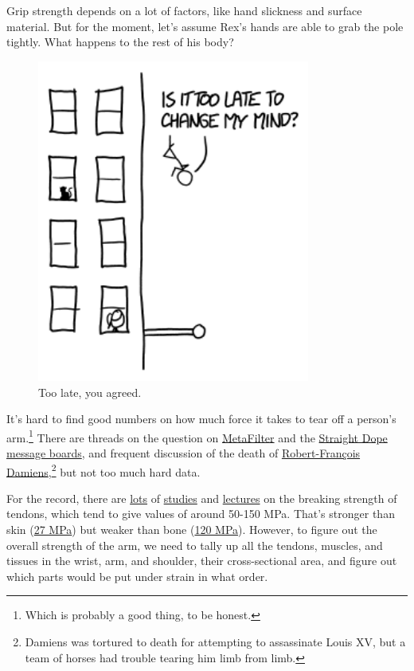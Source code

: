 {{Grip strength depends on a lot of factors, like hand slickness and surface material. But for the moment, let's assume Rex's hands are able to grab the pole tightly. What happens to the rest of his body?}

\begin{figure}[!htbp]
\centering
\includegraphics[scale=0.5, max width=0.8\textwidth]{imgs/a/133/hands.png}
\caption{Too late, you agreed.}
\end{figure}

{It's hard to find good numbers on how much force it takes to tear off a person's arm.{\footnote{Which is probably a good thing, to be honest.} } There are threads on the question on \href{http://ask.metafilter.com/133821/How-much-force-to-tear-off-a-limb}{MetaFilter} and the \href{http://boards.straightdope.com/sdmb/showthread.php?t=515612}{Straight Dope message boards}, and frequent discussion of the death of \href{https://en.wikipedia.org/wiki/Robert-Fran\%C3\%A7ois\_Damiens} {Robert-François Damiens},{\footnote{Damiens was tortured to death for attempting to assassinate Louis XV, but a team of horses had trouble tearing him limb from limb.} } but not too much hard data.}

{For the record, there are \href{http://jeb.biologists.org/content/215/20/3552.abstract}{lots} of \href{http://www.udel.edu/PT/PT\%20Clinical\%20Services/journalclub/sojc/95\_96/apr96/itoi.pdf}{studies} and \href{http://wings.buffalo.edu/eng/mae/courses/417-517/Orthopaedic\%20Biomechanics/Lecture\%203u.pdf}{lectures} on the breaking strength of tendons, which tend to give values of around 50-150 MPa. That's stronger than skin (\href{http://www.ircobi.org/downloads/irc12/pdf\_files/59.pdf}{27 MPa}) but weaker than bone (\href{http://www.robmech.co.za/proceed/ROBMECH2011\_Unene\%20N.\%20MAnganyi\_Biological\%20considerations\%20in\%20the\%20structural\%20design\%20of\%20smart\%20prosthetics.pdf}{120 MPa}). However, to figure out the overall strength of the arm, we need to tally up all the tendons, muscles, and tissues in the wrist, arm, and shoulder, their cross-sectional area, and figure out which parts would be put under strain in what order.}

}
